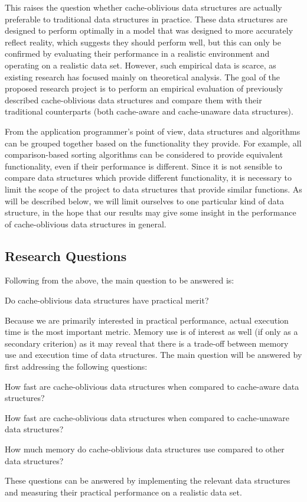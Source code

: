 \documentclass{acm_proc_article-sp}
\begin{document}
This raises the question whether cache-oblivious data structures are actually preferable to traditional data structures in practice. These data structures are designed to perform optimally in a model that was designed to more accurately reflect reality, which suggests they should perform well, but this can only be confirmed by evaluating their performance in a realistic environment and operating on a realistic data set. However, such empirical data is scarce, as existing research has focused mainly on theoretical analysis. The goal of the proposed research project is to perform an empirical evaluation of previously described cache-oblivious data structures and compare them with their traditional counterparts (both cache-aware and cache-unaware data structures).

From the application programmer's point of view, data structures and algorithms can be grouped together based on the functionality they provide. For example, all comparison-based sorting algorithms can be considered to provide equivalent functionality, even if their performance is different. Since it is not sensible to compare data structures which provide different functionality, it is necessary to limit the scope of the project to data structures that provide similar functions. As will be described below, we will limit ourselves to one particular kind of data structure, in the hope that our results may give some insight in the performance of cache-oblivious data structures in general.

\subsection{Research Questions}
Following from the above, the main question to be answered is:
\begin{list}{}{}
\item Do cache-oblivious data structures have practical merit?
\end{list}

Because we are primarily interested in practical performance, actual execution time is the most important metric. Memory use is of interest as well (if only as a secondary criterion) as it may reveal that there is a trade-off between memory use and execution time of data structures. The main question will be answered by first addressing the following questions:
\begin{list}{.}{}
\item How fast are cache-oblivious data structures when compared to cache-aware data structures?
\item How fast are cache-oblivious data structures when compared to cache-unaware data structures?
\item How much memory do cache-oblivious data structures use compared to other data structures?
\end{list}
These questions can be answered by implementing the relevant data structures and measuring their practical performance on a realistic data set.
\end{document}
